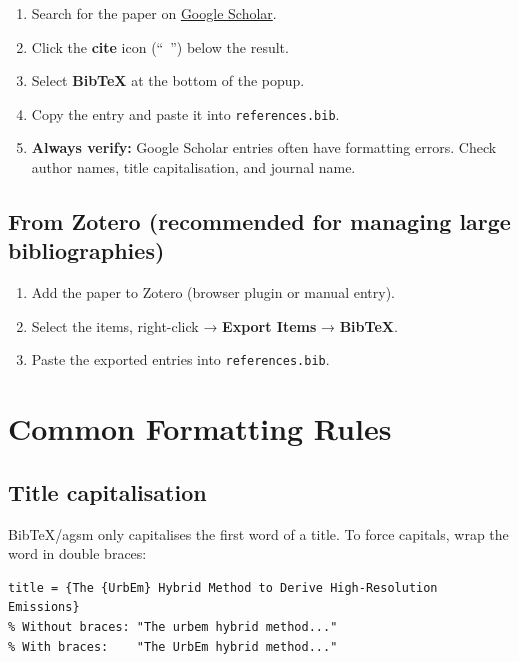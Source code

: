 \documentclass[11pt, a4paper]{article}
\begin{document}
\begin{enumerate}
  \item Search for the paper on \href{https://scholar.google.com}{Google Scholar}.
  \item Click the \textbf{cite} icon (\textquotedblleft~\textquotedblright) below
        the result.
  \item Select \textbf{BibTeX} at the bottom of the popup.
  \item Copy the entry and paste it into \texttt{references.bib}.
  \item \textbf{Always verify:} Google Scholar entries often have formatting
        errors. Check author names, title capitalisation, and journal name.
\end{enumerate}

\subsection{From Zotero (recommended for managing large bibliographies)}

\begin{enumerate}
  \item Add the paper to Zotero (browser plugin or manual entry).
  \item Select the items, right-click → \textbf{Export Items} → \textbf{BibTeX}.
  \item Paste the exported entries into \texttt{references.bib}.
\end{enumerate}

\section{Common Formatting Rules}

\subsection{Title capitalisation}
BibTeX/agsm only capitalises the first word of a title. To force capitals,
wrap the word in double braces:

\begin{lstlisting}
title = {The {UrbEm} Hybrid Method to Derive High-Resolution Emissions}
% Without braces: "The urbem hybrid method..."
% With braces:    "The UrbEm hybrid method..."
\end{lstlisting}
\end{document}
